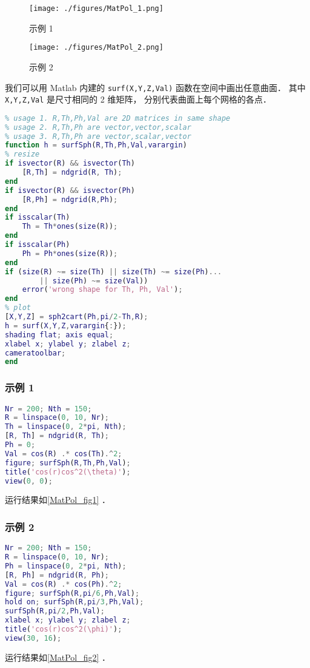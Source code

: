 
\begin{issues}
\issueMissDepend
\issueDraft
\end{issues}

\begin{figure}[ht]
\centering
\texttt{[image: ./figures/MatPol\_1.png]}
\caption{示例 1} \label{MatPol_fig1}
\end{figure}
\begin{figure}[ht]
\centering
\texttt{[image: ./figures/MatPol\_2.png]}
\caption{示例 2} \label{MatPol_fig2}
\end{figure}

我们可以用 Matlab 内建的 \verb|surf(X,Y,Z,Val)| 函数在空间中画出任意曲面． 其中 \verb|X,Y,Z,Val| 是尺寸相同的 2 维矩阵， 分别代表曲面上每个网格的各点．
\begin{lstlisting}[language=matlab]
% surf() in spherical coordinate
% usage 1. R,Th,Ph,Val are 2D matrices in same shape
% usage 2. R,Th,Ph are vector,vector,scalar
% usage 3. R,Th,Ph are vector,scalar,vector
function h = surfSph(R,Th,Ph,Val,varargin)
% resize
if isvector(R) && isvector(Th)
    [R,Th] = ndgrid(R, Th);
end
if isvector(R) && isvector(Ph)
    [R,Ph] = ndgrid(R,Ph);
end
if isscalar(Th)
    Th = Th*ones(size(R));
end
if isscalar(Ph)
    Ph = Ph*ones(size(R));
end
if (size(R) ~= size(Th) || size(Th) ~= size(Ph)...
        || size(Ph) ~= size(Val))
    error('wrong shape for Th, Ph, Val');
end
% plot
[X,Y,Z] = sph2cart(Ph,pi/2-Th,R);
h = surf(X,Y,Z,varargin{:});
shading flat; axis equal;
xlabel x; ylabel y; zlabel z;
cameratoolbar;
end
\end{lstlisting}

\subsubsection{示例 1}
\begin{lstlisting}[language=matlab]
Nr = 200; Nth = 150;
R = linspace(0, 10, Nr);
Th = linspace(0, 2*pi, Nth);
[R, Th] = ndgrid(R, Th);
Ph = 0;
Val = cos(R) .* cos(Th).^2;
figure; surfSph(R,Th,Ph,Val);
title('cos(r)cos^2(\theta)');
view(0, 0);
\end{lstlisting}
运行结果如\autoref{MatPol_fig1} ．

\subsubsection{示例 2}
\begin{lstlisting}[language=matlab]
Nr = 200; Nth = 150;
R = linspace(0, 10, Nr);
Ph = linspace(0, 2*pi, Nth);
[R, Ph] = ndgrid(R, Ph);
Val = cos(R) .* cos(Ph).^2;
figure; surfSph(R,pi/6,Ph,Val);
hold on; surfSph(R,pi/3,Ph,Val);
surfSph(R,pi/2,Ph,Val);
xlabel x; ylabel y; zlabel z;
title('cos(r)cos^2(\phi)');
view(30, 16);
\end{lstlisting}
运行结果如\autoref{MatPol_fig2} ．
